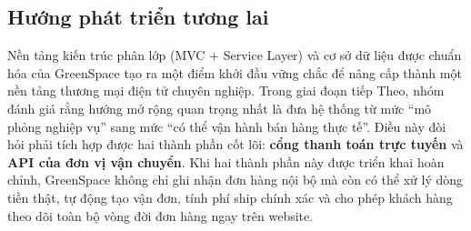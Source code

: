 \documentclass[11pt, a4paper]{article}
\begin{document}
\subsection{Hướng phát triển tương lai}

Nền tảng kiến trúc phân lớp (MVC + Service Layer) và cơ sở dữ liệu được
chuẩn hóa của GreenSpace tạo ra một điểm khởi đầu vững chắc để nâng cấp
thành một nền tảng thương mại điện tử chuyên nghiệp. Trong giai đoạn tiếp
Theo, nhóm đánh giá rằng hướng mở rộng quan trọng nhất là đưa hệ thống từ
mức ``mô phỏng nghiệp vụ'' sang mức ``có thể vận hành bán hàng thực tế''.
Điều này đòi hỏi phải tích hợp được hai thành phần cốt lõi: \textbf{cổng
thanh toán trực tuyến} và \textbf{API của đơn vị vận chuyển}. Khi hai thành
phần này được triển khai hoàn chỉnh, GreenSpace không chỉ ghi nhận đơn hàng
nội bộ mà còn có thể xử lý dòng tiền thật, tự động tạo vận đơn, tính phí
ship chính xác và cho phép khách hàng theo dõi toàn bộ vòng đời đơn hàng
ngay trên website.
\end{document}
